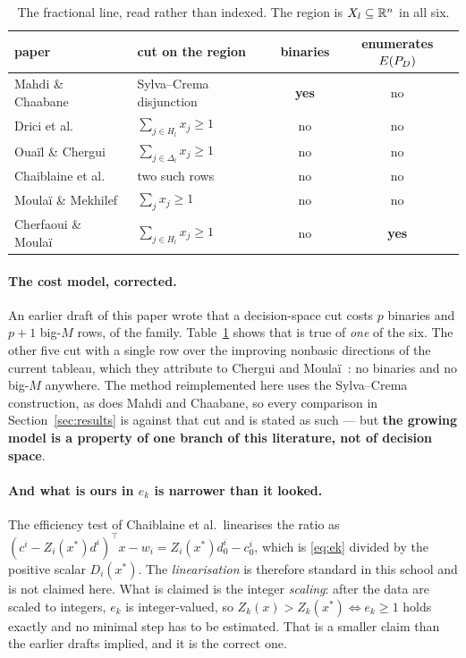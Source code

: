 \documentclass[11pt,a4paper]{article}
\begin{document}
\begin{table}[h]
\centering
\caption{The fractional line, read rather than indexed.  The region is
$X_l \subseteq \mathbb{R}^n$ in all six.}
\label{tab:read}
\small
\begin{tabular}{llcc}
\toprule
paper & cut on the region & binaries & enumerates $E(P_{D})$ \\
\midrule
Mahdi \& Chaabane~\cite{mahdi2015}       & Sylva--Crema disjunction          & \textbf{yes} & no \\
Drici et al.~\cite{drici2018}            & $\sum_{j \in H_l} x_j \geqslant 1$ & no & no \\
Oua\"il \& Chergui~\cite{ouail2019}      & $\sum_{j \in \Delta_l} x_j \geqslant 1$ & no & no \\
Chaiblaine et al.~\cite{chaiblaine2020}  & two such rows                      & no & no \\
Moula\"i \& Mekhilef~\cite{moulai2021}   & $\sum_{j} x_j \geqslant 1$         & no & no \\
Cherfaoui \& Moula\"i~\cite{cherfaoui2021} & $\sum_{j \in H_l} x_j \geqslant 1$ & no & \textbf{yes} \\
\bottomrule
\end{tabular}
\end{table}

\paragraph{The cost model, corrected.}
An earlier draft of this paper wrote that a decision-space cut costs $p$
binaries and $p+1$ big-$M$ rows, of the family.  Table~\ref{tab:read} shows
that is true of \emph{one} of the six.  The other five cut with a single
row over the improving nonbasic directions of the current tableau, which
they attribute to Chergui and Moula\"i~\cite{cherguimoulai2008}: no binaries
and no big-$M$ anywhere.  The method reimplemented here uses the
Sylva--Crema construction, as does Mahdi and Chaabane, so every comparison
in Section~\ref{sec:results} is against that cut and is stated as such ---
but \textbf{the growing model is a property of one branch of this
literature, not of decision space}.

\paragraph{And what is ours in $e_k$ is narrower than it looked.}
The efficiency test of Chaiblaine et al.\ linearises the ratio as
$(c^i - Z_i(x^*)d^i)^{\top}x - w_i = Z_i(x^*)d^i_0 - c^i_0$, which is
\eqref{eq:ek} divided by the positive scalar $D_i(x^*)$.  The
\emph{linearisation} is therefore standard in this school and is not claimed
here.  What is claimed is the integer \emph{scaling}: after the data are
scaled to integers, $e_k$ is integer-valued, so
$Z_k(x) > Z_k(x^*) \iff e_k \geqslant 1$ holds exactly and no minimal step
has to be estimated.  That is a smaller claim than the earlier drafts
implied, and it is the correct one.
\end{document}
